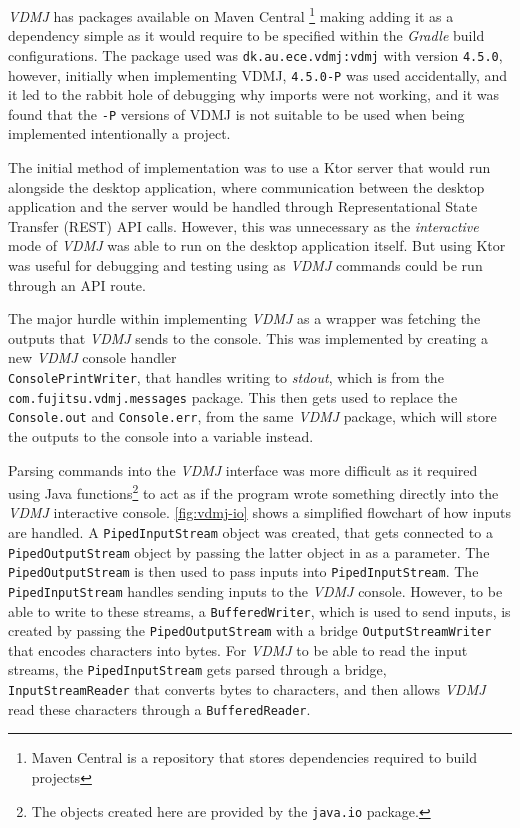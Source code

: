 \documentclass[../dissertation.tex]{subfiles}
\begin{document}
\textit{VDMJ} has packages available on Maven Central%
\footnote{Maven Central is a repository that stores dependencies required to build
projects}
making adding it as a dependency simple as it would require to be specified within
the \textit{Gradle} build configurations.
The package used was \lstinline|dk.au.ece.vdmj:vdmj| with version \lstinline|4.5.0|,
however, initially when implementing VDMJ, \lstinline|4.5.0-P| was used accidentally,
and it led to the rabbit hole of debugging why imports were not working, and it was
found that the \lstinline|-P| versions of VDMJ is not suitable to be used when being
implemented intentionally a project.

The initial method of implementation was to use a Ktor server that would run
alongside the desktop application, where communication between the desktop application
and the server would be handled through Representational State Transfer (REST) API calls.
However, this was unnecessary as the \textit{interactive} mode of \textit{VDMJ}
was able to run on the desktop application itself. But using Ktor was useful for
debugging and testing using as \textit{VDMJ} commands could be run through an
API route.

The major hurdle within implementing \textit{VDMJ} as a wrapper was fetching the
outputs that \textit{VDMJ} sends to the console. This was implemented by
creating a new \textit{VDMJ} console handler \\\lstinline|ConsolePrintWriter|, that
handles writing to \textit{stdout},
which is from the \lstinline|com.fujitsu.vdmj.messages| package.
This then gets used to replace the \lstinline|Console.out| and
\lstinline|Console.err|, from the same \textit{VDMJ} package, which
will store the outputs to the console into a variable instead.

Parsing commands into the \textit{VDMJ} interface was more difficult as it required
using Java functions\footnote{The objects created here are provided by the \lstinline|java.io| package.}
to act as if the program wrote something directly into the \textit{VDMJ} interactive console.
\autoref{fig:vdmj-io} shows a simplified flowchart of how inputs are handled.
A \lstinline|PipedInputStream| object was created, that gets connected to a
\lstinline|PipedOutputStream| object by passing the latter object in as a parameter.
The \lstinline|PipedOutputStream| is then used to pass inputs into \lstinline|PipedInputStream|.
The \lstinline|PipedInputStream| handles sending inputs to the \textit{VDMJ} console.
However, to be able to write to these streams, a \lstinline|BufferedWriter|,
which is used to send inputs, is created by
passing the \lstinline|PipedOutputStream| with a bridge \lstinline|OutputStreamWriter|
that encodes characters into bytes.
For \textit{VDMJ} to be able to read the input streams, the \lstinline|PipedInputStream|
gets parsed through a bridge, \lstinline|InputStreamReader| that converts
bytes to characters, and then allows \textit{VDMJ} read these characters through
a \lstinline|BufferedReader|.
\end{document}
